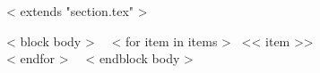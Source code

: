 ~< extends "section.tex" >~

~< block body >~
  ~< for item in items >~
    << item >> \\
  ~< endfor >~
\vspace{-.15in}
~< endblock body >~
